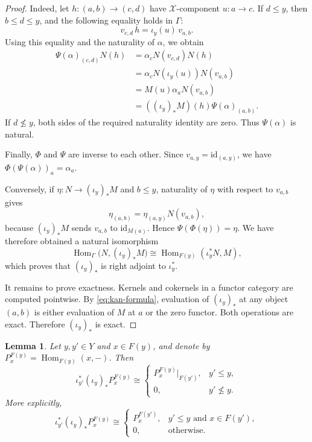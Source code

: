 \documentclass[12pt,a4paper,english,reqno]{amsart}
\theoremstyle{plain}
\newtheorem{lemma}[theorem]{Lemma}
\theoremstyle{definition}
\newcommand{\Hom}{\operatorname{Hom}}
\newcommand{\id}{\mathrm{id}}
\newcommand{\X}{\mathcal X}
\newcommand{\G}{\Gamma}
\begin{document}
\begin{proof}
Indeed, let $h:(a,b)\longrightarrow(c,d)$
have $\X$-component $u:a\to c$. If $d\leq y$, then
$b\leq d\leq y$, and the following equality holds in $\G$:
\[
v_{c,d}\,h
=
\iota_y(u)\,v_{a,b}.
\]
Using this equality and the naturality of $\alpha$, we obtain
\[
\begin{split}
\Psi(\alpha)_{(c,d)}N(h)
&=
\alpha_cN(v_{c,d})N(h)\\
&=
\alpha_cN(\iota_y(u))N(v_{a,b})\\
&=
M(u)\alpha_aN(v_{a,b})\\
&=
((\iota_y)_*M)(h)\Psi(\alpha)_{(a,b)}.
\end{split}
\]
If $d\nleq y$, both sides of the required naturality identity are zero.
Thus $\Psi(\alpha)$ is natural.

Finally, $\Phi$ and $\Psi$ are inverse to each other. Since
$v_{a,y}=\id_{(a,y)}$, we have $\Phi(\Psi(\alpha))_a=\alpha_a$.

Conversely, if $\eta:N\to(\iota_y)_*M$ and $b\leq y$, naturality of
$\eta$ with respect to $v_{a,b}$ gives
\[
\eta_{(a,b)}
=
\eta_{(a,y)}N(v_{a,b}),
\]
because $(\iota_y)_*M$ sends $v_{a,b}$ to $\id_{M(a)}$. Hence $\Psi(\Phi(\eta))=\eta$.
We have therefore obtained a natural isomorphism
\[
\Hom_{\G}\bigl(N,(\iota_y)_*M\bigr)
\cong
\Hom_{F(y)}(\iota_y^*N,M),
\]
which proves that $(\iota_y)_*$ is right adjoint to $\iota_y^*$.

It remains to prove exactness. Kernels and cokernels in a functor
category are computed pointwise. By \eqref{eq:kan-formula}, evaluation
of $(\iota_y)_*$ at any object $(a,b)$ is either evaluation of $M$ at
$a$ or the zero functor. Both operations are exact. Therefore
$(\iota_y)_*$ is exact.
\end{proof}

\begin{lemma}
\label{lem:restriction-kan}
Let $y,y'\in Y$ and $x\in F(y)$, and denote by $P_x^{F(y)}=\Hom_{F(y)}(x,-)$.
Then
\[
\iota_{y'}^*(\iota_y)_*P_x^{F(y)}
\cong
\begin{cases}
P_x^{F(y)}\vert_{F(y')}, & y'\leq y,\\
0,                        & y'\nleq y.
\end{cases}
\]
More explicitly,
\begin{equation}
\iota_{y'}^*(\iota_y)_*P_x^{F(y)}
\cong
\begin{cases}
P_x^{F(y')},
  & y'\leq y\text{ and }x\in F(y'),\\
0,
  & \text{otherwise}.
\end{cases}
\label{eq:restriction-kan}
\end{equation}
\end{lemma}
\end{document}
